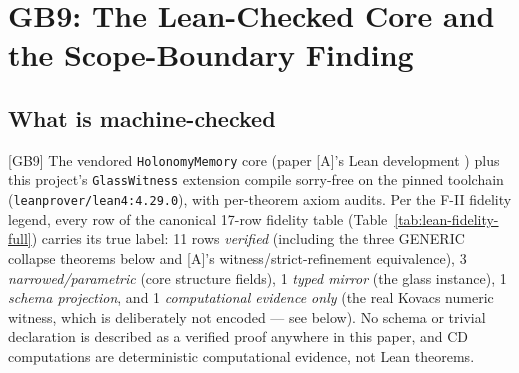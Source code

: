 \documentclass[11pt]{article}
\newcommand{\claimref}[2]{[#1]}
\newcommand{\sbtcite}[1]{\cite{#1}}
\theoremstyle{definition}
\begin{document}
 \section{GB9: The Lean-Checked Core and the Scope-Boundary Finding}
\label{sec:lean}


\subsection{What is machine-checked}

\claimref{GB9}{014c387c154a27d21d86e0454c25fea4ddc7ac8ecd3e7d3ea116d6f068a296c1}
The vendored \texttt{HolonomyMemory} core (paper [A]'s Lean development
\sbtcite{sbt-paper-a}) plus this project's \texttt{GlassWitness} extension compile sorry-free on
the pinned toolchain (\texttt{leanprover/lean4:4.29.0}), with per-theorem axiom audits. Per the
F-II fidelity legend, every row of the canonical 17-row fidelity table
(Table~\ref{tab:lean-fidelity-full}) carries its true label: 11 rows \emph{verified} (including
the three GENERIC collapse theorems below and [A]'s witness/strict-refinement equivalence), 3
\emph{narrowed/parametric} (core structure fields), 1 \emph{typed mirror} (the glass instance), 1
\emph{schema projection}, and 1 \emph{computational evidence only} (the real Kovacs numeric
witness, which is deliberately not encoded --- see below). No schema or trivial declaration is
described as a verified proof anywhere in this paper, and CD computations are deterministic
computational evidence, not Lean theorems.
\end{document}
